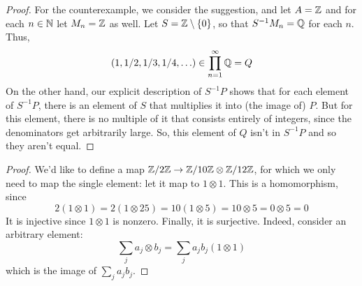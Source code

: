 \documentclass[12pt]{exam}
\begin{document}
\begin{proof}
	For the counterexample, we consider the suggestion, and let $A = \mathbb{Z}$ and for each $n \in \mathbb{N}$ let $M_n = \mathbb{Z}$ as well. Let $S = \mathbb{Z} \setminus \{0\}$, so that $S^{-1}M_n = \mathbb{Q}$ for each $n$. Thus,
	\[ (1, 1/2, 1/3, 1/4, \ldots) \in \prod_{n=1}^\infty \mathbb{Q} = Q \]
	On the other hand, our explicit description of $S^{-1}P$ shows that for each element of $S^{-1}P$, there is an element of $S$ that multiplies it into (the image of) $P$. But for this element, there is no multiple of it that consists entirely of integers, since the denominators get arbitrarily large. So, this element of $Q$ isn't in $S^{-1}P$ and so they aren't equal.
\end{proof}

\begin{proof}
	We'd like to define a map $\mathbb{Z}/2\mathbb{Z} \to \mathbb{Z}/10\mathbb{Z} \otimes \mathbb{Z}/12\mathbb{Z}$, for which we only need to map the single element: let it map to $1 \otimes 1$. This is a homomorphism, since
	\[ 2(1 \otimes 1) = 2(1 \otimes 25) = 10(1 \otimes 5) = 10 \otimes 5 = 0 \otimes 5 = 0 \]
	It is injective since $1 \otimes 1$ is nonzero. Finally, it is surjective. Indeed, consider an arbitrary element:
	\[ \sum_j a_j \otimes b_j = \sum_j a_jb_j(1 \otimes 1) \]
	which is the image of $\sum_j a_jb_j$.
\end{proof}
\end{document}
